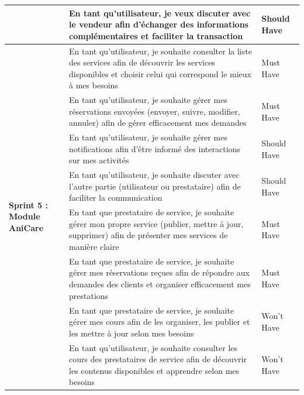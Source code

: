 \begin{longtable}{|p{4cm}|p{9.5cm}|p{2cm}|}
& En tant qu’utilisateur, je veux discuter avec le vendeur afin d’échanger des informations complémentaires et faciliter la transaction  & Should Have \\
\hline
\multirow{8}{4cm}{\textbf{Sprint 5 : Module AniCare}}
& En tant qu’utilisateur, je souhaite consulter la liste des services afin de découvrir les services disponibles et choisir celui qui correspond le mieux à mes besoins & Must Have \\
\cline{2-3}

& En tant qu’utilisateur, je souhaite gérer mes réservations envoyées (envoyer, suivre, modifier, annuler) afin de gérer efficacement mes demandes & Must Have \\
\cline{2-3}

& En tant qu’utilisateur, je souhaite gérer mes notifications afin d’être informé des interactions sur mes activités & Should Have \\
\cline{2-3}

& En tant qu’utilisateur, je souhaite discuter avec l’autre partie (utilisateur ou prestataire) afin de faciliter la communication & Should Have \\
\cline{2-3}

& En tant que prestataire de service, je souhaite gérer mon propre service (publier, mettre à jour, supprimer) afin de présenter mes services de manière claire & Must Have \\
\cline{2-3}

& En tant que prestataire de service, je souhaite gérer mes réservations reçues afin de répondre aux demandes des clients et organiser efficacement mes prestations & Must Have \\
\cline{2-3}

& En tant que prestataire de service, je souhaite gérer mes cours afin de les organiser, les publier et les mettre à jour selon mes besoins & Won’t Have \\
\cline{2-3}

& En tant qu’utilisateur, je souhaite consulter les cours des prestataires de service afin de découvrir les contenus disponibles et apprendre selon mes besoins & Won’t Have \\
\hline 


\end{longtable}
